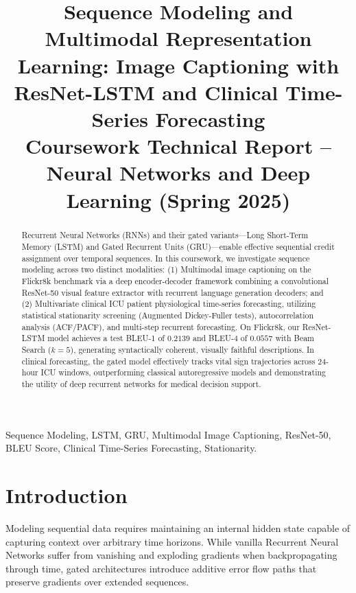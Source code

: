 \documentclass[conference]{IEEEtran}
\begin{document}
\title{Sequence Modeling and Multimodal Representation Learning: Image Captioning with ResNet-LSTM and Clinical Time-Series Forecasting\\
\large Coursework Technical Report -- Neural Networks and Deep Learning (Spring 2025)}

\author{
}

\maketitle

\begin{abstract}
Recurrent Neural Networks (RNNs) and their gated variants---Long Short-Term Memory (LSTM) and Gated Recurrent Units (GRU)---enable effective sequential credit assignment over temporal sequences. In this coursework, we investigate sequence modeling across two distinct modalities: (1) Multimodal image captioning on the Flickr8k benchmark via a deep encoder-decoder framework combining a convolutional ResNet-50 visual feature extractor with recurrent language generation decoders; and (2) Multivariate clinical ICU patient physiological time-series forecasting, utilizing statistical stationarity screening (Augmented Dickey-Fuller tests), autocorrelation analysis (ACF/PACF), and multi-step recurrent forecasting. On Flickr8k, our ResNet-LSTM model achieves a test BLEU-1 of $0.2139$ and BLEU-4 of $0.0557$ with Beam Search ($k=5$), generating syntactically coherent, visually faithful descriptions. In clinical forecasting, the gated model effectively tracks vital sign trajectories across 24-hour ICU windows, outperforming classical autoregressive models and demonstrating the utility of deep recurrent networks for medical decision support.
\end{abstract}

\begin{IEEEkeywords}
Sequence Modeling, LSTM, GRU, Multimodal Image Captioning, ResNet-50, BLEU Score, Clinical Time-Series Forecasting, Stationarity.
\end{IEEEkeywords}

\section{Introduction}
Modeling sequential data requires maintaining an internal hidden state capable of capturing context over arbitrary time horizons. While vanilla Recurrent Neural Networks suffer from vanishing and exploding gradients when backpropagating through time, gated architectures introduce additive error flow paths that preserve gradients over extended sequences.
\end{document}
